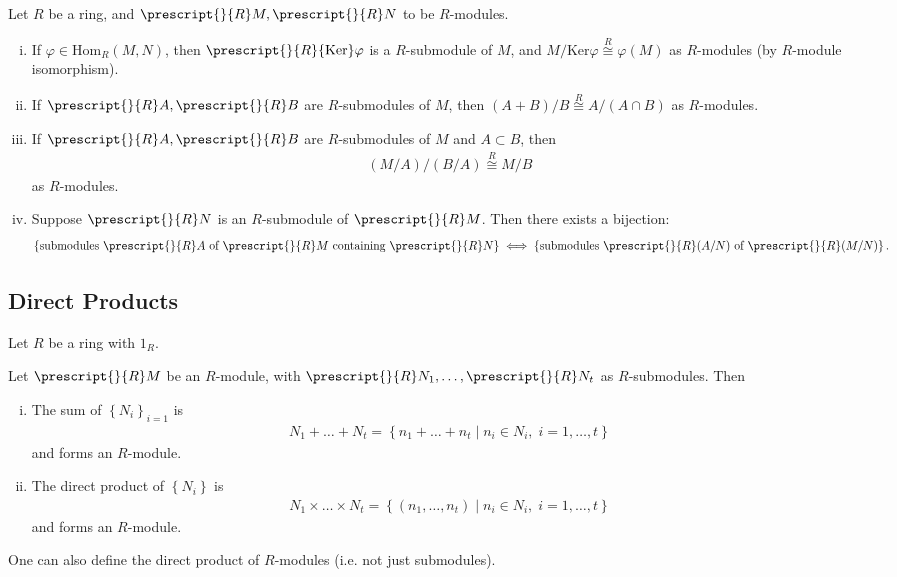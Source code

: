\documentclass{memoir}
\begin{document}
\begin{thm}
	Let \(R\) be a ring, and \(\prescript{}{R}M, \prescript{}{R}N\) to be \(R\)-modules.
	\begin{enumerate}[(i).]
		\item If \(\varphi \in \textrm{Hom}_R(M,N)\), then \( \prescript{}{R}{\textrm{Ker}}\varphi\) is a \(R\)-submodule of \(M\), and \(M / \textrm{Ker}\varphi \stackrel{R}{\cong} \varphi(M)\) as \(R\)-modules (by \(R\)-module isomorphism).
		\item If \(\prescript{}{R}A,\prescript{}{R}B\) are \(R\)-submodules of \(M\), then \((A+B) / B \stackrel{R}{\cong} A / (A\cap B)\) as \(R\)-modules.
		\item If \(\prescript{}{R}A,\prescript{}{R}B\) are \(R\)-submodules of \(M\) and \(A\subset B\), then
			\begin{align*}
			(M / A) / (B / A) \stackrel{R}{\cong} M / B
			\end{align*}
			as \(R\)-modules.
		\item Suppose \(\prescript{}{R}N\) is an \(R\)-submodule of \(\prescript{}{R}M\). Then there exists a bijection:
			\begin{align*}
				\left\{ \text{submodules } \prescript{}{R}A \text{ of \(\prescript{}{R}M\) containing \(\prescript{}{R}N\)} \right\} \iff \left\{ \text{submodules \(\prescript{}{R}(A / N)\) of \(\prescript{}{R}(M/N)\)} \right\} .
			\end{align*}
	\end{enumerate}
\end{thm}

\subsection{Direct Products}
\label{sub:direct_products}

Let \(R\) be a ring with \(1_R\).
\begin{prop}
	Let \(\prescript{}{R}M\) be an \(R\)-module, with \(\prescript{}{R}N_1,\ldots,\prescript{}{R}N_t\) as \(R\)-submodules. Then
	\begin{enumerate}[(i).]
		\item The sum of \(\left\{ N_i \right\}_{i=1}\) is
			\begin{align*}
				N_1+\ldots+N_t = \left\{n_1+\ldots+n_t \mid n_i \in N_i, \; i=1,\ldots,t \right\} 
			\end{align*}
			and forms an \(R\)-module.
		\item The direct product of \(\left\{ N_i \right\} \) is
			\begin{align*}
				N_1\times \ldots\times N_t = \left\{(n_1,\ldots,n_t) \mid n_i \in N_i, \; i=1,\ldots,t \right\} 
			\end{align*}
			and forms an \(R\)-module.
	\end{enumerate}
\end{prop}
One can also define the direct product of \(R\)-modules (i.e. not just submodules).
\end{document}

